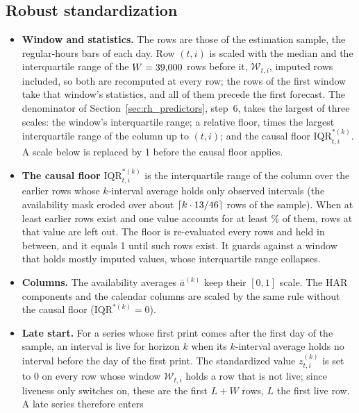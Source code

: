\subsection{Robust standardization}
\label{app:rh_dp_scale}
\begin{itemize}
\item \textbf{Window and statistics.} The rows are those of the estimation sample, the \rhorNBars{} regular-hours bars
  of each day. Row $(t,i)$ is scaled with the median and the interquartile range of the $W = 39{,}000$ rows
  before it, $\mathcal W_{t,i}$, imputed rows included, so both are recomputed at every row; the rows of the first
  window take that window's statistics, and all of them precede the first forecast. The denominator of
  Section~\ref{sec:rh_predictors}, step~6, takes the largest of three scales: the window's interquartile range; a
  relative floor, \rhdmIqrFloorFrac{} times the largest interquartile range of the column up to $(t,i)$; and the
  causal floor $\mathrm{IQR}^{\ast(k)}_{t,i}$. A scale below \rhdmIqrEps{} is replaced by 1 before the causal floor
  applies.
\item \textbf{The causal floor} $\mathrm{IQR}^{\ast(k)}_{t,i}$ is the interquartile range of the column over the
  earlier rows whose $k$-interval average holds only observed intervals (the availability mask eroded over about
  $\lceil k \cdot 13 / 46 \rceil$ rows of the sample). When at least \rhdmModeMinPrints{}
  earlier rows exist and one value accounts for at least \rhdmModeShare\% of them, rows at that value are left out.
  The floor is re-evaluated every \rhdmIqrGridStep{} rows and held in between, and it equals 1 until
  \rhdmIqrMinRows{} such rows exist. It guards against a window that holds mostly imputed values, whose interquartile
  range collapses.
\item \textbf{Columns.} The availability averages $\bar a^{(k)}$ keep their $[0, 1]$ scale. The HAR components and the
  calendar columns are scaled by the same rule without the causal floor ($\mathrm{IQR}^{\ast(k)} = 0$).
\item \textbf{Late start.} For a series whose first print comes after the first day of the sample, an interval is live
  for horizon $k$ when its $k$-interval average holds no interval before the day of the first print. The standardized
  value $z^{(k)}_{t,i}$ is set to 0 on every row whose window $\mathcal W_{t,i}$ holds a row that is not live; since
  liveness only switches on, these are the first $L + W$ rows, $L$ the first live row. A late series therefore enters

\end{itemize}
